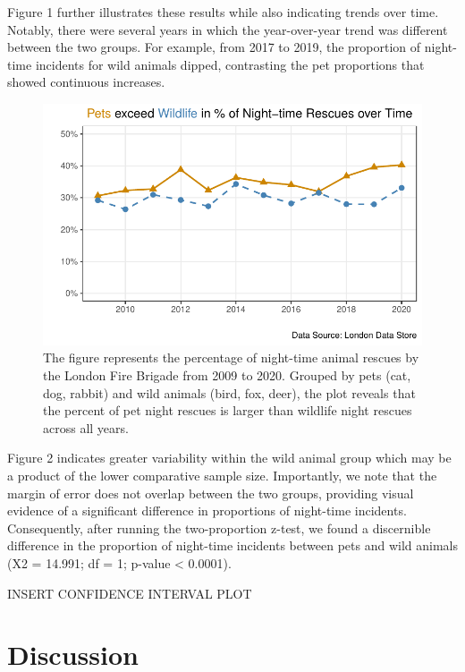 \documentclass[
]{article}
\begin{document}
Figure 1 further illustrates these results while also indicating trends
over time. Notably, there were several years in which the year-over-year
trend was different between the two groups. For example, from 2017 to
2019, the proportion of night-time incidents for wild animals dipped,
contrasting the pet proportions that showed continuous increases.

\begin{figure}[H]

{\centering \includegraphics{Final_Report_files/figure-pdf/fig-night-animal-1.pdf}

}

\caption{\label{fig-night-animal}The figure represents the percentage of
night-time animal rescues by the London Fire Brigade from 2009 to 2020.
Grouped by pets (cat, dog, rabbit) and wild animals (bird, fox, deer),
the plot reveals that the percent of pet night rescues is larger than
wildlife night rescues across all years.}

\end{figure}

Figure 2 indicates greater variability within the wild animal group
which may be a product of the lower comparative sample size.
Importantly, we note that the margin of error does not overlap between
the two groups, providing visual evidence of a significant difference in
proportions of night-time incidents. Consequently, after running the
two-proportion z-test, we found a discernible difference in the
proportion of night-time incidents between pets and wild animals (X2 =
14.991; df = 1; p-value \textless{} 0.0001).

INSERT CONFIDENCE INTERVAL PLOT

\hypertarget{discussion}{%
\section{Discussion}\label{discussion}}
\end{document}
